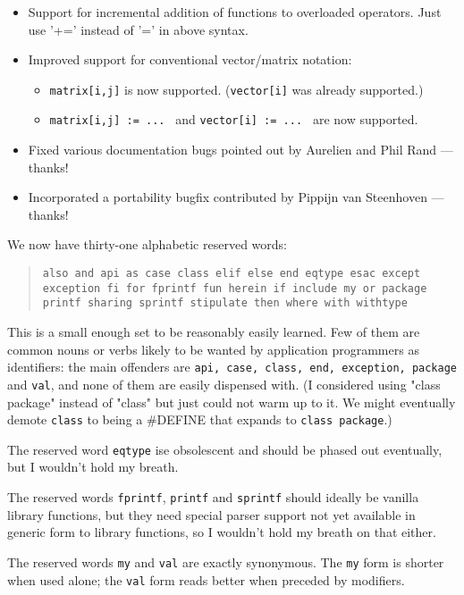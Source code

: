 \begin{itemize}
\begin{itemize}
\begin{itemize}
\begin{verbatim}
\end{verbatim}
\end{itemize}
\end{itemize}
\item Support for incremental addition of functions to overloaded operators. Just use '+=' instead of '=' in above syntax.
\item Improved support for conventional vector/matrix notation:
\begin{itemize}
\item {\tt matrix[i,j]} is now supported. ({\tt vector[i]} was already supported.)
\item {\tt matrix[i,j] := ... } and {\tt vector[i] := ... } are now supported.
\end{itemize}
\item Fixed various documentation bugs pointed out by Aurelien and Phil Rand --- thanks!
\item Incorporated a portability bugfix contributed by Pippijn van Steenhoven --- thanks!
\end{itemize}

We now have thirty-one alphabetic reserved words:
\begin{quotation}
{\tt also and api as case class elif else end eqtype esac except 
exception fi for fprintf fun herein if include my or package printf 
sharing sprintf stipulate then where with withtype}
\end{quotation}
This is a small enough set to be reasonably easily learned.  Few of 
them are common nouns or verbs likely to be wanted by application programmers 
as identifiers: the main offenders are {\tt api, case, class, end, exception, package} and {\tt val}, 
and none of them are easily dispensed with.  (I considered using "class package" 
instead of "class" but just could not warm up to it. We might eventually demote 
{\tt class} to being a \#DEFINE that expands to {\tt class package}.)

The reserved word {\tt eqtype} ise obsolescent and should be phased out 
eventually, but I wouldn't hold my breath.

The reserved words {\tt fprintf}, 
{\tt printf} and {\tt sprintf} should ideally be vanilla library functions, 
but they need special parser support not yet available in generic form to 
library functions, so I wouldn't hold my breath on that either.

The reserved words {\tt my} and {\tt val} are exactly synonymous.  The 
{\tt my} form is shorter when used alone; the {\tt val} form reads better 
when preceded by modifiers.

